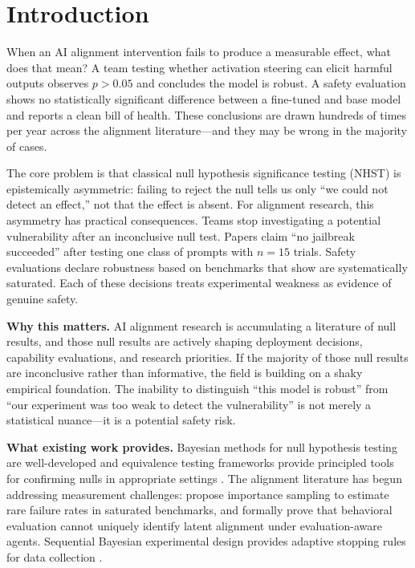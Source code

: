 \section{Introduction}
\label{sec:intro}

When an AI alignment intervention fails to produce a measurable effect, what does that
mean? A team testing whether activation steering can elicit harmful outputs observes
$p > 0.05$ and concludes the model is robust. A safety evaluation shows no statistically
significant difference between a fine-tuned and base model and reports a clean bill
of health. These conclusions are drawn hundreds of times per year across the alignment
literature---and they may be wrong in the majority of cases.

The core problem is that classical null hypothesis significance testing (NHST) is
epistemically asymmetric: failing to reject the null tells us only ``we could not
detect an effect,'' not that the effect is absent. For alignment research, this
asymmetry has practical consequences. Teams stop investigating a potential vulnerability
after an inconclusive null test. Papers claim ``no jailbreak succeeded'' after testing
one class of prompts with $n=15$ trials. Safety evaluations declare robustness based
on benchmarks that \citet{kim2026fivnines} show are systematically saturated. Each
of these decisions treats experimental weakness as evidence of genuine safety.

{\bf Why this matters.} AI alignment research is accumulating a literature of null
results, and those null results are actively shaping deployment decisions, capability
evaluations, and research priorities. If the majority of those null results are
inconclusive rather than informative, the field is building on a shaky empirical
foundation. The inability to distinguish ``this model is robust'' from ``our experiment
was too weak to detect the vulnerability'' is not merely a statistical nuance---it is
a potential safety risk.

{\bf What existing work provides.} Bayesian methods for null hypothesis testing are
well-developed \citep{ly2021bayes,bartos2026efficient,schad2024accurate} and
equivalence testing frameworks provide principled tools for confirming
nulls in appropriate settings \citep{dale2024confirming}. The alignment literature
has begun addressing measurement challenges: \citet{kim2026fivnines} propose
importance sampling to estimate rare failure rates in saturated benchmarks, and
\citet{santos2026limits} formally prove that behavioral evaluation cannot uniquely
identify latent alignment under evaluation-aware agents. Sequential Bayesian
experimental design provides adaptive stopping rules for data collection
\citep{foster2025stopping,robbins2025robust}.

